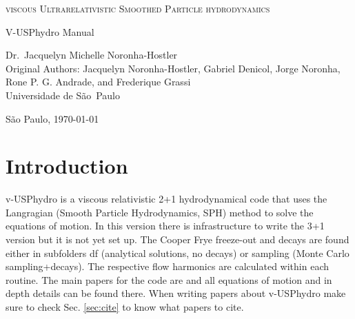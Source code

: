 \documentclass[article]{revtex4-1}
\def\ao{\~ao\ }
\begin{document}
\thispagestyle{empty}

\begin{center}\Large\scshape
viscous Ultrarelativistic Smoothed Particle hydrodynamics
\end{center}
\vspace*{1.8cm}
\begin{center}\LARGE
{\sc V-USPhydro Manual}
\end{center}
\vspace{8.0ex}
\begin{minipage}{1\textwidth}
\begin{center}
{\sc Dr.\ Jacquelyn Michelle Noronha-Hostler}\\
\vspace{8.0ex}
{\sc  Original Authors:  Jacquelyn Noronha-Hostler, Gabriel Denicol, Jorge Noronha, Rone P. G. Andrade, and Frederique Grassi}\\
\vspace{8.0ex}
{\sc Universidade de S\ao Paulo}\\
\vspace{8.0ex}
\end{center}
\end{minipage}
\vspace*{1.5ex}
\begin{center}
S\~ao Paulo, \today
\end{center}

\clearpage


\newpage


\section{Introduction}

v-USPhydro is a  viscous relativistic 2+1 hydrodynamical code that uses the Langragian (Smooth Particle Hydrodynamics, SPH) method to solve the equations of motion.  In this version there is infrastructure to write the 3+1 version but it is not yet set up.  The Cooper Frye freeze-out and decays are found either in subfolders df (analytical solutions, no decays) or sampling (Monte Carlo sampling+decays).  The respective flow harmonics are calculated within each routine. The main papers for the code are \cite{code} and all equations of motion and in depth details can be found there.  When writing papers about v-USPhydro make sure to check Sec. \ref{sec:cite} to know what papers to cite. 
\end{document}
